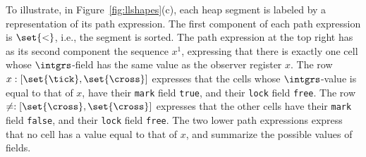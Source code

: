To illustrate, in
Figure~\ref{fig:llshapes}(c), each heap segment is labeled by
a representation of its path expression. The first component of
each path expression is $\set{<}$, i.e., the segment
is sorted. The path expression at the top right has as its second component
the sequence $x^1$, expressing that there is exactly one cell whose
$\intgrs$-field has the same value as the observer register $x$.
The row $x:[\set{\mbox{\tick}},\set{\mbox{\cross}}]$ expresses
that the cells whose $\intgrs$-value is equal to that of $x$, have
their {\tt mark} field {\tt true}, and their {\tt lock} field {\tt free}.
The row $\neq:[\set{\mbox{\cross}},\set{\mbox{\cross}}]$ expresses
that the other cells have
their {\tt mark} field {\tt false}, and their {\tt lock} field {\tt free}.
The two lower path expressions express that no cell has a value equal to
that of $x$, and summarize the possible values of fields.
  

